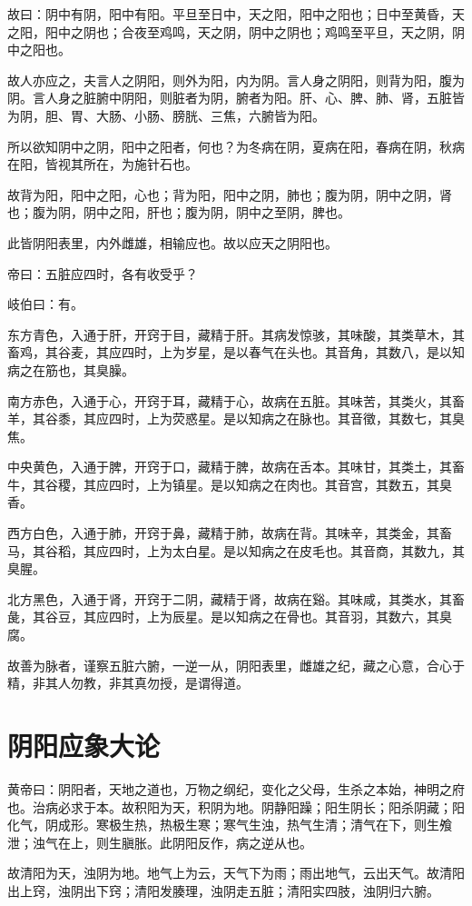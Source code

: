 \documentclass{article}%
\begin{document}
故曰：阴中有阴，阳中有阳。平旦至日中，天之阳，阳中之阳也；日中至黄昏，天之阳，阳中之阴也；合夜至鸡鸣，天之阴，阴中之阴也；鸡鸣至平旦，天之阴，阴中之阳也。

故人亦应之，夫言人之阴阳，则外为阳，内为阴。言人身之阴阳，则背为阳，腹为阴。言人身之脏腑中阴阳，则脏者为阴，腑者为阳。肝、心、脾、肺、肾，五脏皆为阴，胆、胃、大肠、小肠、膀胱、三焦，六腑皆为阳。

所以欲知阴中之阴，阳中之阳者，何也？为冬病在阴，夏病在阳，春病在阴，秋病在阳，皆视其所在，为施针石也。

故背为阳，阳中之阳，心也；背为阳，阳中之阴，肺也；腹为阴，阴中之阴，肾也；腹为阴，阴中之阳，肝也；腹为阴，阴中之至阴，脾也。

此皆阴阳表里，内外雌雄，相输应也。故以应天之阴阳也。

帝曰：五脏应四时，各有收受乎？

岐伯曰：有。

东方青色，入通于肝，开窍于目，藏精于肝。其病发惊骇，其味酸，其类草木，其畜鸡，其谷麦，其应四时，上为岁星，是以春气在头也。其音角，其数八，是以知病之在筋也，其臭臊。

南方赤色，入通于心，开窍于耳，藏精于心，故病在五脏。其味苦，其类火，其畜羊，其谷黍，其应四时，上为荧惑星。是以知病之在脉也。其音徵，其数七，其臭焦。

中央黄色，入通于脾，开窍于口，藏精于脾，故病在舌本。其味甘，其类土，其畜牛，其谷稷，其应四时，上为镇星。是以知病之在肉也。其音宫，其数五，其臭香。

西方白色，入通于肺，开窍于鼻，藏精于肺，故病在背。其味辛，其类金，其畜马，其谷稻，其应四时，上为太白星。是以知病之在皮毛也。其音商，其数九，其臭腥。

北方黑色，入通于肾，开窍于二阴，藏精于肾，故病在谿。其味咸，其类水，其畜彘，其谷豆，其应四时，上为辰星。是以知病之在骨也。其音羽，其数六，其臭腐。

故善为脉者，谨察五脏六腑，一逆一从，阴阳表里，雌雄之纪，藏之心意，合心于精，非其人勿教，非其真勿授，是谓得道。


\section{阴阳应象大论}
黄帝曰：阴阳者，天地之道也，万物之纲纪，变化之父母，生杀之本始，神明之府也。治病必求于本。故积阳为天，积阴为地。阴静阳躁；阳生阴长；阳杀阴藏；阳化气，阴成形。寒极生热，热极生寒；寒气生浊，热气生清；清气在下，则生飧泄；浊气在上，则生䐜胀。此阴阳反作，病之逆从也。

故清阳为天，浊阴为地。地气上为云，天气下为雨；雨出地气，云出天气。故清阳出上窍，浊阴出下窍；清阳发腠理，浊阴走五脏；清阳实四肢，浊阴归六腑。
\end{document}
